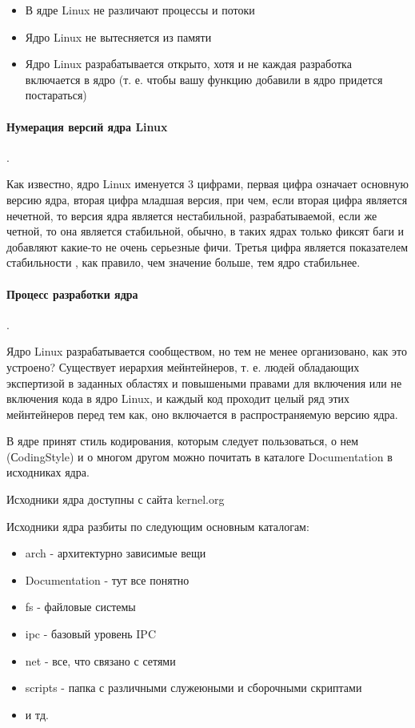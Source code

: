 \begin{itemize}
\item В ядре Linux не различают процессы и потоки

\item Ядро Linux не вытесняется из памяти

\item Ядро Linux разрабатывается открыто, хотя и не каждая разработка включается в ядро (т. е. чтобы вашу функцию добавили в ядро
придется постараться)
\end{itemize}

\paragraph{Нумерация версий ядра Linux}.

Как известно, ядро Linux именуется 3 цифрами, первая цифра означает основную версию ядра, вторая цифра младшая версия, при чем, если
вторая цифра является нечетной, то версия ядра является нестабильной, разрабатываемой, если же четной, то она является стабильной,
обычно, в таких ядрах только фиксят баги и добавляют какие-то не очень серьезные фичи. Третья цифра является показателем стабильности
, как правило, чем значение больше, тем ядро стабильнее.

\paragraph{Процесс разработки ядра}.

Ядро Linux разрабатывается сообществом, но тем не менее организовано, как это устроено? Существует иерархия мейнтейнеров, т. е. людей
обладающих экспертизой в заданных областях и повышеными правами для включения или не включения кода в ядро Linux, и каждый код
проходит целый ряд этих мейнтейнеров перед тем как, оно включается в распространяемую версию ядра.

В ядре принят стиль кодирования, которым следует пользоваться, о нем (СodingStyle) и о многом другом можно почитать в каталоге
Documentation в исходниках ядра.

Исходники ядра доступны с сайта kernel.org

Исходники ядра разбиты по следующим основным каталогам:

\begin{itemize}
\item arch - архитектурно зависимые вещи

\item Documentation - тут все понятно

\item fs - файловые системы

\item ipc - базовый уровень IPC

\item net - все, что связано с сетями

\item scripts - папка с различными служеюными и сборочными скриптами

\item и тд.
\end{itemize}

